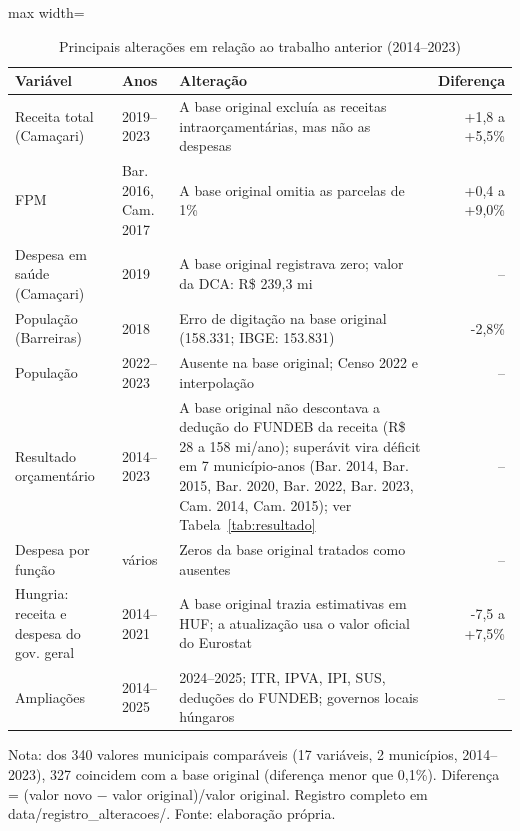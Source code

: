 \begin{table}[H]
\centering\footnotesize
\setlength{\tabcolsep}{4pt}
\caption{Principais alterações em relação ao trabalho anterior (2014--2023)}
\label{tab:alteracoes}
\begin{adjustbox}{max width=\textwidth}
\begin{tabular}{p{3.3cm}p{2.1cm}p{6.2cm}r}
\toprule
Variável & Anos & Alteração & Diferença \\
\midrule
Receita total (Camaçari) & 2019--2023 & A base original excluía as receitas intraorçamentárias, mas não as despesas & +1,8 a +5,5\% \\
FPM & Bar. 2016, Cam. 2017 & A base original omitia as parcelas de 1\% & +0,4 a +9,0\% \\
Despesa em saúde (Camaçari) & 2019 & A base original registrava zero; valor da DCA: R\$ 239,3 mi & -- \\
População (Barreiras) & 2018 & Erro de digitação na base original (158.331; IBGE: 153.831) & -2,8\% \\
População & 2022--2023 & Ausente na base original; Censo 2022 e interpolação & -- \\
Resultado orçamentário & 2014--2023 & A base original não descontava a dedução do FUNDEB da receita (R\$ 28 a 158 mi/ano); superávit vira déficit em 7 município-anos (Bar. 2014, Bar. 2015, Bar. 2020, Bar. 2022, Bar. 2023, Cam. 2014, Cam. 2015); ver Tabela~\ref{tab:resultado} & -- \\
Despesa por função & vários & Zeros da base original tratados como ausentes & -- \\
Hungria: receita e despesa do gov. geral & 2014--2021 & A base original trazia estimativas em HUF; a atualização usa o valor oficial do Eurostat & -7,5 a +7,5\% \\
Ampliações & 2014--2025 & 2024--2025; ITR, IPVA, IPI, SUS, deduções do FUNDEB; governos locais húngaros & -- \\
\bottomrule
\end{tabular}
\end{adjustbox}
\par\vspace{3pt}\parbox{\textwidth}{\scriptsize Nota: dos 340 valores municipais comparáveis (17 variáveis, 2 municípios, 2014--2023), 327 coincidem com a base original (diferença menor que 0,1\%). Diferença = (valor novo $-$ valor original)/valor original. Registro completo em data/registro\_alteracoes/. Fonte: elaboração própria.}
\end{table}
